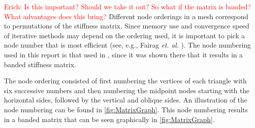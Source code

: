 \textcolor{red}{Erich: Is this important?  Should we take it out? So what if the matrix is banded?  What advantages does this bring?}
Different node orderings in a mesh correspond to permutations of the stiffness
matrix. 
Since memory use and convergence speed of iterative methods may
depend on the ordering used, it is important to pick a node number that is most
efficient (see, e.g., Fairag \emph{et. al.} \cite{Fairag}). 
The node numbering used in this report is that used in \cite{Fairag}, since it was shown there that it
results in a banded stiffness matrix.

The node ordering consisted of first numbering the vertices of each triangle
with six successive numbers and then numbering the midpoint nodes starting
with the horizontal sides, followed by the vertical and oblique sides. An
illustration of the node numbering can be found in \autoref{fig:MatrixGraph}.
This node numbering results in a banded matrix that can be seen graphically in
\autoref{fig:MatrixGraph}.


